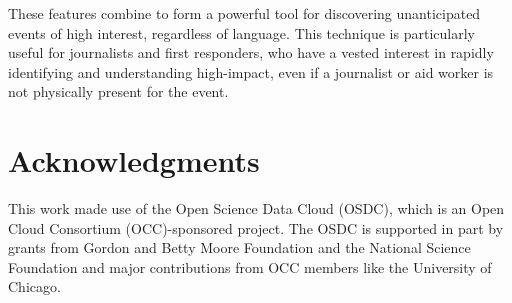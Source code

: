\documentclass[letterpaper]{article}
\begin{document}
These features combine to form a powerful tool for discovering unanticipated events of high interest, regardless of language.
This technique is particularly useful for journalists and first responders, who have a vested interest in rapidly identifying and understanding high-impact, even if a journalist or aid worker is not physically present for the event.


\section{Acknowledgments}
This work made use of the Open Science Data Cloud (OSDC), which is an Open Cloud Consortium (OCC)-sponsored project. 
The OSDC is supported in part by grants from Gordon and Betty Moore Foundation and the National Science Foundation and major contributions from OCC members like the University of Chicago. 

%

\end{document}
